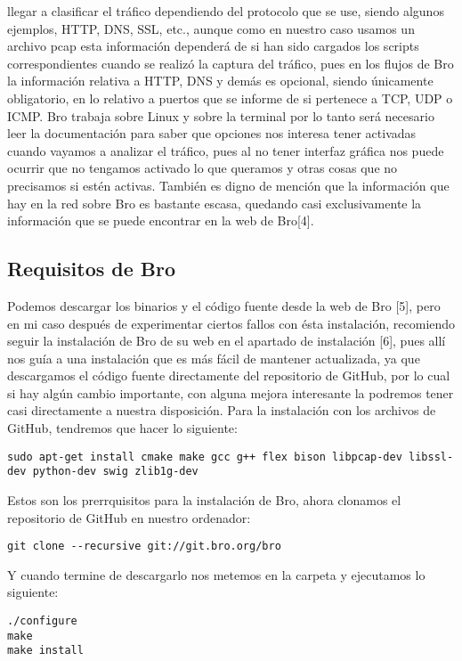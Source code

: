 llegar a clasificar el tráfico dependiendo del protocolo que se use, siendo 
algunos ejemplos, HTTP, DNS, SSL, etc., aunque como en nuestro caso usamos 
un archivo pcap esta información dependerá de si han sido cargados los scripts 
correspondientes cuando se realizó la captura del tráfico, pues en los flujos 
de Bro la información relativa a HTTP, DNS y demás es opcional, siendo únicamente 
obligatorio, en lo relativo a puertos que se informe de si pertenece a TCP, UDP o ICMP.
\intro
Bro trabaja sobre Linux y sobre la terminal por lo tanto será necesario leer 
la documentación para saber que opciones nos interesa tener activadas cuando 
vayamos a analizar el tráfico, pues al no tener interfaz gráfica nos puede 
ocurrir que no tengamos activado lo que queramos y otras cosas que no 
precisamos si estén activas.
\intro
También es digno de mención que la información que hay en la red sobre Bro 
es bastante escasa, quedando casi exclusivamente la información que se puede 
encontrar en la web de Bro[4].

\subsection{Requisitos de Bro}

Podemos descargar los binarios y el código fuente desde la web de Bro [5], 
pero en mi caso después de experimentar ciertos fallos con ésta instalación, 
recomiendo seguir la instalación de Bro de su web en el apartado de instalación [6], 
pues allí nos guía a una instalación que es más fácil de mantener actualizada, 
ya que descargamos el código fuente directamente del repositorio de GitHub, 
por lo cual si hay algún cambio importante, con alguna mejora interesante 
la podremos tener casi directamente a nuestra disposición.
\intro
Para la instalación con los archivos de GitHub, tendremos que hacer lo siguiente:
\intro
\begin{verbatim}
sudo apt-get install cmake make gcc g++ flex bison libpcap-dev libssl-dev python-dev swig zlib1g-dev
\end{verbatim}


Estos son los prerrquisitos para la instalación de Bro, ahora clonamos el 
repositorio de GitHub en nuestro ordenador:
\intro
\begin{verbatim}
git clone --recursive git://git.bro.org/bro
\end{verbatim}

Y cuando termine de descargarlo nos metemos en la carpeta y ejecutamos lo siguiente:
\intro
\begin{verbatim}
./configure
make
make install
\end{verbatim}

